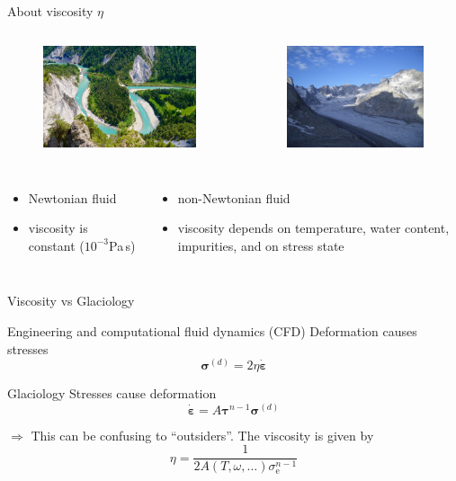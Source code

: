 \documentclass[hide notes,intlimits,unknownkeysallowed]{beamer}
\newcommand{\epsdot}{\dot{\varepsilon}}
\begin{document}
\begin{frame}{About viscosity $\eta$}
    \begin{columns}
      \column[C]{6cm}
      \begin{figure}
        \includegraphics[height=3cm]{rhine_river}
      \end{figure}
      \column[C]{6cm}
      \begin{figure}
        \includegraphics[height=3cm]{forno}
      \end{figure}
  \end{columns}
    \begin{columns}
      \column[C]{6cm}
      \begin{itemize}
        \item Newtonian fluid
        \item viscosity is constant ($10^{-3}$Pa\,s)
      \end{itemize}
      \column[C]{6cm}
      \begin{itemize}
      \item non-Newtonian fluid
        \item viscosity depends on temperature, water content, impurities, and on \alert{stress state}
      \end{itemize}
  \end{columns}
\end{frame}

\begin{frame}{Viscosity vs Glaciology}
  \begin{block}{Engineering and computational fluid dynamics (CFD)}
    Deformation causes stresses
  \begin{equation}
  \bm{\sigma}^{(d)} = 2 \eta \bm{\epsdot}
  \end{equation}
  \end{block}
  \begin{block}{Glaciology}
    Stresses cause deformation
  \begin{equation}
  \bm{\epsdot} = A \bm{\tau}^{n-1}  \bm{\sigma}^{(d)}
  \end{equation}
  \end{block}
  \alert{$\Rightarrow$} This can be confusing to ``outsiders''. The viscosity is given by
  \begin{equation}
    \eta = \frac{1}{2 A(T,\omega,\ldots) \sigma_{\mathrm{e}}^{n-1}}
  \end{equation}
\end{frame}
\end{document}
